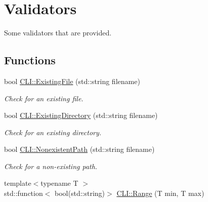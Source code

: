 \hypertarget{group__validator__group}{}\section{Validators}
\label{group__validator__group}


Some validators that are provided.  


\subsection*{Functions}
\begin{DoxyCompactItemize}
\item 
\mbox{\label{group__validator__group_ga3686c9f734556a7708e9450c936c20b2}} 
bool \hyperlink{group__validator__group_ga3686c9f734556a7708e9450c936c20b2}{C\+L\+I\+::\+Existing\+File} (std\+::string filename)
\begin{DoxyCompactList}\small\item\em Check for an existing file. \end{DoxyCompactList}\item 
\mbox{\label{group__validator__group_gaf988c38e9f27c2577877b61e4fab7dae}} 
bool \hyperlink{group__validator__group_gaf988c38e9f27c2577877b61e4fab7dae}{C\+L\+I\+::\+Existing\+Directory} (std\+::string filename)
\begin{DoxyCompactList}\small\item\em Check for an existing directory. \end{DoxyCompactList}\item 
\mbox{\label{group__validator__group_ga0c95be9a1d6429b133d4f1edbf5598b0}} 
bool \hyperlink{group__validator__group_ga0c95be9a1d6429b133d4f1edbf5598b0}{C\+L\+I\+::\+Nonexistent\+Path} (std\+::string filename)
\begin{DoxyCompactList}\small\item\em Check for a non-\/existing path. \end{DoxyCompactList}\item 
\mbox{\label{group__validator__group_gae30c14787933ba22e7f4b36d0eeac172}} 
{\footnotesize template$<$typename T $>$ }\\std\+::function$<$ bool(std\+::string)$>$ \hyperlink{group__validator__group_gae30c14787933ba22e7f4b36d0eeac172}{C\+L\+I\+::\+Range} (T min, T max)

\end{DoxyCompactItemize}
